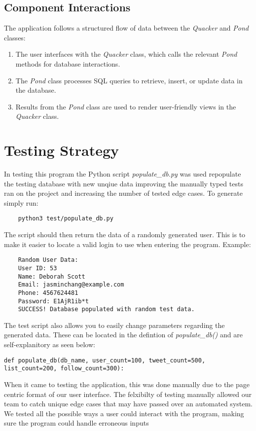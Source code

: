\documentclass[11pt]{article}
\begin{document}
	\subsection*{Component Interactions}
	The application follows a structured flow of data between the \textit{Quacker} and \textit{Pond} classes:
	\begin{enumerate}
		\item The user interfaces with the \textit{Quacker} class, which calls the relevant \textit{Pond} methods for database interactions.
		\item The \textit{Pond} class processes SQL queries to retrieve, insert, or update data in the database.
		\item Results from the \textit{Pond} class are used to render user-friendly views in the \textit{Quacker} class.
	\end{enumerate}


\section{Testing Strategy}
In testing this program the Python script \textit{populate\_db.py} was used repopulate the testing database with 
new unqiue data improving the manually typed tests ran on the project and increasing the number of tested edge 
cases. To generate simply run:
\begin{verbatim}
	python3 test/populate_db.py
\end{verbatim}
The script should then return the data of a randomly generated user. This is to make it easier to locate a valid
login to use when entering the program. Example: 
\begin{verbatim}
	Random User Data:
	User ID: 53
	Name: Deborah Scott
	Email: jasminchang@example.com
	Phone: 4567624481
	Password: E1AjR1ib*t
	SUCCESS! Database populated with random test data.
\end{verbatim}
The test script also allows you to easily change parameters regarding the generated data. These can be located in the
defintion of \textit{populate\_db()} and are self-explanitory as seen below:
\begin{lstlisting}
def populate_db(db_name, user_count=100, tweet_count=500, list_count=200, follow_count=300):
\end{lstlisting}
When it came to testing the application, this was done manually due to the page centric format of our user interface. 
The felxibilty of testing manually allowed our team to catch unique edge cases that may have passed over an automated
system. \\We tested all the possible ways a user could interact with the program, making sure the program could handle erroneous inputs
\end{document}
